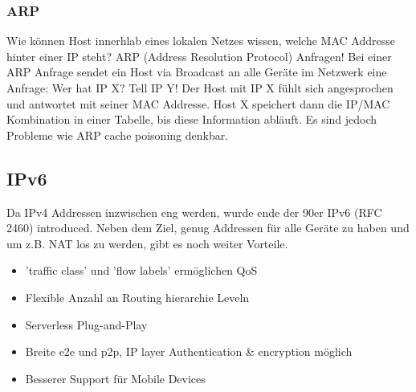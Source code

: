 		\subsubsection{ARP}
			Wie können Host innerhlab eines lokalen Netzes wissen, welche MAC Addresse hinter einer IP steht? ARP (Address Resolution Protocol) Anfragen! Bei einer ARP Anfrage sendet ein Host via Broadcast an alle Geräte im Netzwerk eine Anfrage: Wer hat IP X? Tell IP Y! Der Host mit IP X fühlt sich angesprochen und antwortet mit seiner MAC Addresse. Host X speichert dann die IP/MAC Kombination in einer Tabelle, bis diese Information abläuft. Es sind jedoch Probleme wie ARP cache poisoning denkbar.

	\subsection{IPv6}
		Da IPv4 Addressen inzwischen eng werden, wurde ende der 90er IPv6 (RFC 2460) introduced. Neben dem Ziel, genug Addressen für alle Geräte zu haben und um z.B. NAT los zu werden, gibt es noch weiter Vorteile. 
		\begin{itemize}
			\item 'traffic class' und 'flow labels' ermöglichen QoS
			\item Flexible Anzahl an Routing hierarchie Leveln
			\item Serverless Plug-and-Play
			\item Breite e2e und p2p, IP layer Authentication \& encryption möglich
			\item Besserer Support für Mobile Devices
		\end{itemize}
